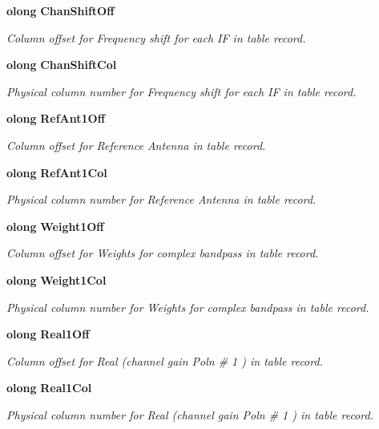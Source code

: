 \begin{CompactItemize}
{\bf olong} {\bf Chan\-Shift\-Off}
\begin{CompactList}\small\item\em Column offset for Frequency shift for each IF in table record. \item\end{CompactList}\item 
{\bf olong} {\bf Chan\-Shift\-Col}
\begin{CompactList}\small\item\em Physical column number for Frequency shift for each IF in table record. \item\end{CompactList}\item 
{\bf olong} {\bf Ref\-Ant1Off}
\begin{CompactList}\small\item\em Column offset for Reference Antenna in table record. \item\end{CompactList}\item 
{\bf olong} {\bf Ref\-Ant1Col}
\begin{CompactList}\small\item\em Physical column number for Reference Antenna in table record. \item\end{CompactList}\item 
{\bf olong} {\bf Weight1Off}
\begin{CompactList}\small\item\em Column offset for Weights for complex bandpass in table record. \item\end{CompactList}\item 
{\bf olong} {\bf Weight1Col}
\begin{CompactList}\small\item\em Physical column number for Weights for complex bandpass in table record. \item\end{CompactList}\item 
{\bf olong} {\bf Real1Off}
\begin{CompactList}\small\item\em Column offset for Real (channel gain Poln \# 1 ) in table record. \item\end{CompactList}\item 
{\bf olong} {\bf Real1Col}
\begin{CompactList}\small\item\em Physical column number for Real (channel gain Poln \# 1 ) in table record. \item\end{CompactList}\item 

\end{CompactItemize}
